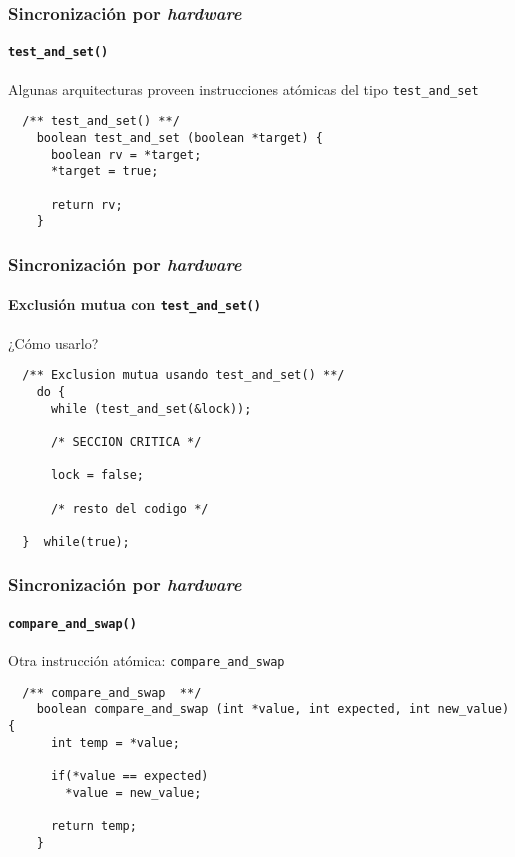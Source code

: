 \documentclass[letter]{beamer}
\begin{document}
\begin{frame}[fragile]
  \frametitle{Sincronización por {\em hardware} }
  \framesubtitle{{\tt test\_and\_set()}}

  Algunas arquitecturas proveen instrucciones atómicas del tipo \verb+test_and_set+

\begin{verbatim}
  /** test_and_set() **/
    boolean test_and_set (boolean *target) {
      boolean rv = *target;
      *target = true;
  
      return rv;
    }
\end{verbatim}
  
\end{frame}

\begin{frame}[fragile]
  \frametitle{Sincronización por {\em hardware} }
  \framesubtitle{Exclusión mutua con {\tt test\_and\_set()}}

  ¿Cómo usarlo?

\begin{verbatim}
  /** Exclusion mutua usando test_and_set() **/
    do {
      while (test_and_set(&lock));
      
      /* SECCION CRITICA */
      
      lock = false;
  
      /* resto del codigo */
      
  }  while(true);
\end{verbatim}

\end{frame}

\begin{frame}[fragile]
  \frametitle{Sincronización por {\em hardware} }
  \framesubtitle{{\tt compare\_and\_swap()}}

  Otra instrucción atómica: \verb+compare_and_swap+

\begin{verbatim}
  /** compare_and_swap  **/
    boolean compare_and_swap (int *value, int expected, int new_value) {
      int temp = *value;

      if(*value == expected)
        *value = new_value;
  
      return temp;
    }
\end{verbatim}
  
\end{frame}
\end{document}
